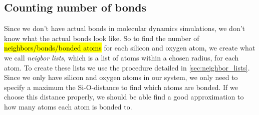 % 
% 
% 

\subsection{Counting number of bonds}
Since we don't have actual bonds in molecular dynamics simulations, we don't know what the actual bonds look like. So to find the number of \hl{neighbors/bonds/bonded atoms} for each silicon and oxygen atom, we create what we call \emph{neigbor lists}, which is a list of atoms within a chosen radius, for each atom. To create these lists we use the procedure detailed in \cref{sec:neighbor_lists}. Since we only have silicon and oxygen atoms in our system, we only need to specify a maximum the Si-O-distance to find which atoms are bonded. If we choose this distance properly, we should be able find a good approximation to how many atoms each atom is bonded to.



